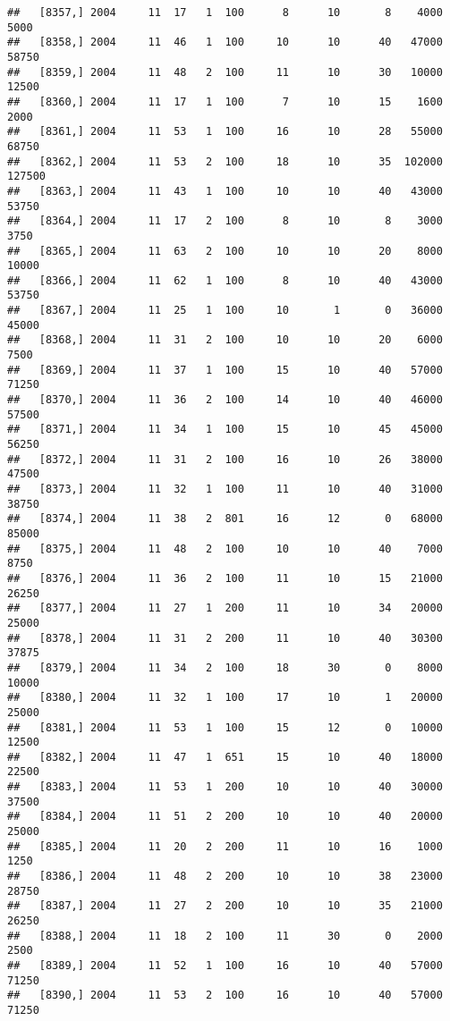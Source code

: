 \documentclass{article}\usepackage[]{graphicx}\usepackage[]{color}
\makeatletter
\newenvironment{kframe}{%
 \def\at@end@of@kframe{}%
 \ifinner\ifhmode%
  \def\at@end@of@kframe{\end{minipage}}%
  \begin{minipage}{\columnwidth}%
 \fi\fi%
 \def\FrameCommand##1{\hskip\@totalleftmargin \hskip-\fboxsep
 \colorbox{shadecolor}{##1}\hskip-\fboxsep
     \hskip-\linewidth \hskip-\@totalleftmargin \hskip\columnwidth}%
 \MakeFramed {\advance\hsize-\width
   \@totalleftmargin\z@ \linewidth\hsize
   \@setminipage}}%
 {\par\unskip\endMakeFramed%
 \at@end@of@kframe}
\newenvironment{knitrout}{}{} %
\makeatother
\begin{document}
\begin{knitrout}
\begin{kframe}
\begin{verbatim}
##   [8357,] 2004     11  17   1  100      8      10       8    4000    5000
##   [8358,] 2004     11  46   1  100     10      10      40   47000   58750
##   [8359,] 2004     11  48   2  100     11      10      30   10000   12500
##   [8360,] 2004     11  17   1  100      7      10      15    1600    2000
##   [8361,] 2004     11  53   1  100     16      10      28   55000   68750
##   [8362,] 2004     11  53   2  100     18      10      35  102000  127500
##   [8363,] 2004     11  43   1  100     10      10      40   43000   53750
##   [8364,] 2004     11  17   2  100      8      10       8    3000    3750
##   [8365,] 2004     11  63   2  100     10      10      20    8000   10000
##   [8366,] 2004     11  62   1  100      8      10      40   43000   53750
##   [8367,] 2004     11  25   1  100     10       1       0   36000   45000
##   [8368,] 2004     11  31   2  100     10      10      20    6000    7500
##   [8369,] 2004     11  37   1  100     15      10      40   57000   71250
##   [8370,] 2004     11  36   2  100     14      10      40   46000   57500
##   [8371,] 2004     11  34   1  100     15      10      45   45000   56250
##   [8372,] 2004     11  31   2  100     16      10      26   38000   47500
##   [8373,] 2004     11  32   1  100     11      10      40   31000   38750
##   [8374,] 2004     11  38   2  801     16      12       0   68000   85000
##   [8375,] 2004     11  48   2  100     10      10      40    7000    8750
##   [8376,] 2004     11  36   2  100     11      10      15   21000   26250
##   [8377,] 2004     11  27   1  200     11      10      34   20000   25000
##   [8378,] 2004     11  31   2  200     11      10      40   30300   37875
##   [8379,] 2004     11  34   2  100     18      30       0    8000   10000
##   [8380,] 2004     11  32   1  100     17      10       1   20000   25000
##   [8381,] 2004     11  53   1  100     15      12       0   10000   12500
##   [8382,] 2004     11  47   1  651     15      10      40   18000   22500
##   [8383,] 2004     11  53   1  200     10      10      40   30000   37500
##   [8384,] 2004     11  51   2  200     10      10      40   20000   25000
##   [8385,] 2004     11  20   2  200     11      10      16    1000    1250
##   [8386,] 2004     11  48   2  200     10      10      38   23000   28750
##   [8387,] 2004     11  27   2  200     10      10      35   21000   26250
##   [8388,] 2004     11  18   2  100     11      30       0    2000    2500
##   [8389,] 2004     11  52   1  100     16      10      40   57000   71250
##   [8390,] 2004     11  53   2  100     16      10      40   57000   71250

\end{verbatim}
\end{kframe}
\end{knitrout}
\end{document}
